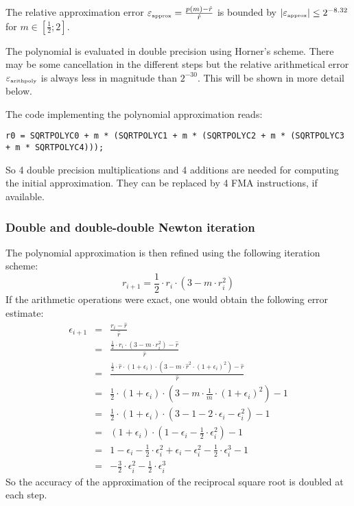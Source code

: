 The relative approximation error $\epsilon_{\mbox{\tiny approx}} =
\frac{p\left( m\right) - \hat{r}}{\hat{r}}$ is bounded by $\left \vert
\epsilon_{\mbox{\tiny approx}} \right \vert \leq 2^{-8.32}$ for $m \in
\left[ \frac{1}{2}; 2 \right]$.

The polynomial is evaluated in double precision using Horner's
scheme. There may be some cancellation in the different steps but the
relative arithmetical error $\epsilon_{\mbox{\tiny arithpoly}}$ is
always less in magnitude than $2^{-30}$. This will be shown in more
detail below.

The code implementing the polynomial approximation reads:
\begin{lstlisting}[caption={Polynomial approximation},firstnumber=1]
r0 = SQRTPOLYC0 + m * (SQRTPOLYC1 + m * (SQRTPOLYC2 + m * (SQRTPOLYC3 + m * SQRTPOLYC4)));
\end{lstlisting}
So 4 double precision multiplications and 4 additions are needed for computing the
initial approximation. They can be replaced by 4 FMA instructions, if available.

\subsubsection{Double and double-double Newton iteration}
The polynomial approximation is then refined using the following iteration scheme:
$$r_{i+1} = \frac{1}{2} \cdot r_i \cdot (3 - m \cdot r_i^2)$$
If the arithmetic operations were exact, one would obtain the following error estimate:
\begin{eqnarray*}
\epsilon_{i+1} & = & \frac{r_i - \hat{r}}{\hat{r}} \\ & = &
\frac{\frac{1}{2} \cdot r_i \cdot \left(3 - m \cdot r_i^2\right) -
\hat{r}}{\hat{r}} \\
& = & \frac{\frac{1}{2} \cdot \hat{r} \cdot
\left( 1 + \epsilon_i \right) \cdot \left( 3 - m \cdot \hat{r}^2 \cdot
\left( 1 + \epsilon_i \right)^2 \right) - \hat{r}}{\hat{r}} \\
& = & \frac{1}{2} \cdot \left( 1 + \epsilon_i \right) \cdot \left( 3 - m \cdot \frac{1}{m} \cdot \left( 1 +
\epsilon_i\right)^2 \right) - 1 \\
& = & \frac{1}{2} \cdot \left( 1 + \epsilon_i \right) \cdot \left( 3 - 1 - 2 \cdot \epsilon_i - \epsilon_i^2
\right) - 1 \\
& = & \left( 1 + \epsilon_i \right) \cdot \left( 1 - \epsilon_i - \frac{1}{2} \cdot \epsilon_i^2
\right) - 1 \\
& = & 1 - \epsilon_i - \frac{1}{2} \cdot \epsilon_i^2 + \epsilon_i - \epsilon_i^2 - \frac{1}{2} \cdot \epsilon_i^3 - 1\\
& = & - \frac{3}{2} \cdot \epsilon_i^2 - \frac{1}{2} \cdot \epsilon_i^3
\end{eqnarray*}
So the accuracy of the approximation of the reciprocal square root is doubled at each step.


